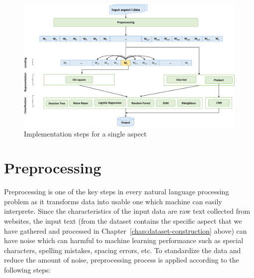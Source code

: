 \begin{figure}[h]
	\centering
	\includegraphics[width=\linewidth]{Chapter3/Figs/model2.pdf}
	\caption{Implementation steps for a single aspect}
	\label{fig:model2}
\end{figure}

\section{Preprocessing}
\label{sec:preprocessing}
Preprocessing is one of the key steps in every natural language processing problem as it transforms data into usable one which machine can easily interprete. Since the characteristics of the input data are raw text collected from websites, the input text (from the dataset contains the specific aspect that we have gathered and processed in Chapter~\ref{chap:dataset-construction} above) can have noise which can harmful to machine learning performance such as special characters, spelling mistakes, spacing errors, etc. To standardize the data and reduce the amount of noise, preprocessing process is applied according to the following steps:


